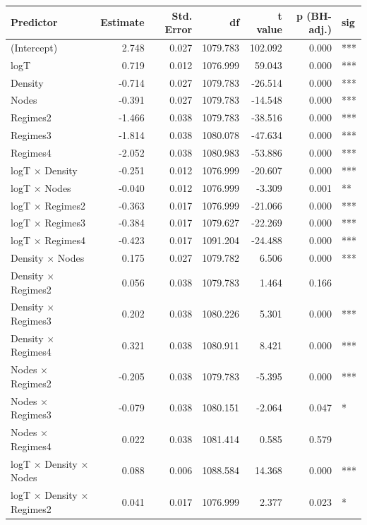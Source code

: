 \begin{table}[ht]
\centering
\begin{tabular}{lrrrrrl}
  \hline
Predictor & Estimate & Std. Error & df & t value & p (BH-adj.) & sig \\ 
  \hline
(Intercept) & 2.748 & 0.027 & 1079.783 & 102.092 & 0.000 & *** \\ 
  logT & 0.719 & 0.012 & 1076.999 & 59.043 & 0.000 & *** \\ 
  Density & -0.714 & 0.027 & 1079.783 & -26.514 & 0.000 & *** \\ 
  Nodes & -0.391 & 0.027 & 1079.783 & -14.548 & 0.000 & *** \\ 
  Regimes2 & -1.466 & 0.038 & 1079.783 & -38.516 & 0.000 & *** \\ 
  Regimes3 & -1.814 & 0.038 & 1080.078 & -47.634 & 0.000 & *** \\ 
  Regimes4 & -2.052 & 0.038 & 1080.983 & -53.886 & 0.000 & *** \\ 
  logT × Density & -0.251 & 0.012 & 1076.999 & -20.607 & 0.000 & *** \\ 
  logT × Nodes & -0.040 & 0.012 & 1076.999 & -3.309 & 0.001 & ** \\ 
  logT × Regimes2 & -0.363 & 0.017 & 1076.999 & -21.066 & 0.000 & *** \\ 
  logT × Regimes3 & -0.384 & 0.017 & 1079.627 & -22.269 & 0.000 & *** \\ 
  logT × Regimes4 & -0.423 & 0.017 & 1091.204 & -24.488 & 0.000 & *** \\ 
  Density × Nodes & 0.175 & 0.027 & 1079.782 & 6.506 & 0.000 & *** \\ 
  Density × Regimes2 & 0.056 & 0.038 & 1079.783 & 1.464 & 0.166 &  \\ 
  Density × Regimes3 & 0.202 & 0.038 & 1080.226 & 5.301 & 0.000 & *** \\ 
  Density × Regimes4 & 0.321 & 0.038 & 1080.911 & 8.421 & 0.000 & *** \\ 
  Nodes × Regimes2 & -0.205 & 0.038 & 1079.783 & -5.395 & 0.000 & *** \\ 
  Nodes × Regimes3 & -0.079 & 0.038 & 1080.151 & -2.064 & 0.047 & * \\ 
  Nodes × Regimes4 & 0.022 & 0.038 & 1081.414 & 0.585 & 0.579 &  \\ 
  logT × Density × Nodes & 0.088 & 0.006 & 1088.584 & 14.368 & 0.000 & *** \\ 
  logT × Density × Regimes2 & 0.041 & 0.017 & 1076.999 & 2.377 & 0.023 & * \\ 

\end{tabular}
\end{table}
